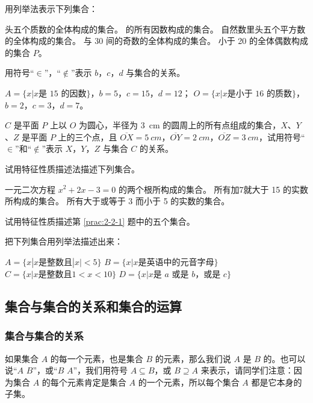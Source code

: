 \begin{Practice}
	\begin{question}
		\item\label{prac:2-2-1} 用列举法表示下列集合：
		\begin{tasks}
			\task 头五个质数的全体构成的集合。
			 的所有因数构成的集合。
			\task 自然数里头五个平方数的全体构成的集合。
			 与 30 间的奇数的全体构成的集合。
			\task 小于 20 的全体偶数构成的集合 $P$。
		\end{tasks}
		\item 用符号“$\in$”，“$\notin$”表示 $b$，$c$，$d$ 与集合的关系。
		\begin{tasks}
			\task $A=\{x|x\text{是 15 的因数}\}$，$b=5$，$c=15$，$d=12$；
			\task $O=\{x|x\text{是小于 16 的质数}\}$，$b=2$，$c=3$，$d=7$。
		\end{tasks}
		\item $C$ 是平面 $P$ 上以 $O$ 为圆心，半径为 \qty{3}{cm} 的圆周上的所有点组成的集合，$X$、$Y$、$Z$ 是平面 $P$ 上的三个点，且 $\overline{OX}=\qty{5}{cm}$，$\overline{OY}=\qty{2}{cm}$，$\overline{OZ}=\qty{3}{cm}$，试用符号“$\in$”和“$\notin$”表示 $X$，$Y$，$Z$ 与集合 $C$ 的关系。
		\item 试用特征性质描述法描述下列集合。
		\begin{tasks}
			\task 一元二次方程 $x^2+2x-3=0$ 的两个根所构成的集合。
			\task 所有加7就大于 15 的实数所构成的集合。
			\task 所有大于或等于 3 而小于 5 的实数的集合。
		\end{tasks}
		\item 试用特征性质描述第 \ref{prac:2-2-1} 题中的五个集合。
		\item 把下列集合用列举法描述出来：
		\begin{tasks}
			\task $A=\{x|x\text{是整数且}|x|<5\}$
			\task $B=\{x|x\text{是英语中的元音字母}\}$
			\task $C=\{x|x\text{是整数且}1<x<10  \}$
			\task $D=\{x|x\text{是 $a$ 或是 $b$，或是 $c$}\}$
		\end{tasks}
	\end{question} 
\end{Practice}

\subsection{集合与集合的关系和集合的运算}

\subsubsection{集合与集合的关系}
如果集合 $A$ 的每一个元素，也是集合 $B$ 的元素，那么我们说 $A$ 是 $B$ 的。也可以说“$A$  $B$”，或“$B$  $A$”，我们用符号 $A\subseteq B$，或 $B\supseteq A$ 来表示，请同学们注意：因为集合 $A$ 的每个元素肯定是集合 $A$ 的一个元素，所以每个集合 $A$ 都是它本身的子集。

